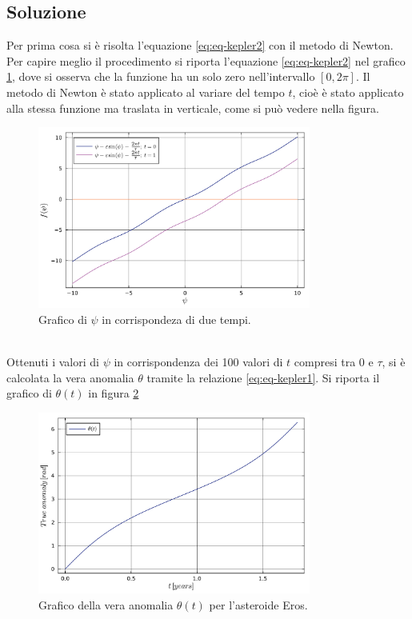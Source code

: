 \documentclass[letterpaper, 12pt]{article}
\begin{document}
\subsection{Soluzione}
Per prima cosa si è risolta l'equazione \ref{eq:eq-kepler2} con il metodo di Newton. Per capire meglio il 
procedimento si riporta l'equazione \ref{eq:eq-kepler2} nel grafico \ref{fig:es3_3_4_1}, dove si osserva che 
la funzione ha un solo zero nell'intervallo $[0,2\pi]$. Il metodo di Newton è stato applicato al variare
del tempo $t$, cioè è stato applicato alla stessa funzione ma traslata in verticale, come si può vedere
nella figura. \\
\begin{figure}[!ht]
    \centering
    \includegraphics[width=0.8\textwidth]{3341.pdf}
    \caption{Grafico di $\psi$ in corrispondeza di due tempi.}
    \label{fig:es3_3_4_1}    
\end{figure}
\\
Ottenuti i valori di $\psi$ in corrispondenza dei 100 valori di $t$ compresi tra $0$ e $\tau$, si è calcolata
la vera anomalia $\theta$ tramite la relazione \ref{eq:eq-kepler1}. Si riporta il grafico di $\theta(t)$ in
figura \ref{fig:es3_3_4_2}
\begin{figure}[!ht]
    \centering
    \includegraphics[width=0.8\textwidth]{3342.pdf}
    \caption{Grafico della vera anomalia $\theta(t)$ per l'asteroide Eros.}
    \label{fig:es3_3_4_2}
\end{figure}
\end{document}
